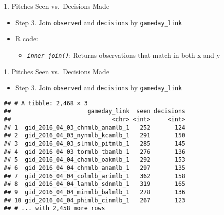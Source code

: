 \begin{frame}[fragile]{1. Pitches Seen vs.~Decisions Made}

\begin{itemize}

\item
  Step 3. Join \texttt{observed} and \texttt{decisions} by
  \texttt{gameday\_link}
\item
  R code:

  \begin{itemize}
  
  \item
    \emph{\texttt{inner\_join()}}: Returns observations that match in
    both x and y
  \end{itemize}
\end{itemize}

\footnotesize

\begin{Shaded}
\begin{Highlighting}[]
\StringTok{ } \NormalTok{)}
\end{Highlighting}
\end{Shaded}

\end{frame}

\begin{frame}[fragile]{1. Pitches Seen vs.~Decisions Made}

\begin{itemize}

\item
  Step 3. Join \texttt{observed} and \texttt{decisions} by
  \texttt{gameday\_link}
\end{itemize}

\footnotesize

\begin{Shaded}
\begin{Highlighting}[]
\StringTok{ } \NormalTok{))}
\end{Highlighting}
\end{Shaded}

\begin{verbatim}
## # A tibble: 2,468 × 3
##                      gameday_link  seen decisions
##                             <chr> <int>     <int>
## 1  gid_2016_04_03_chnmlb_anamlb_1   252       124
## 2  gid_2016_04_03_nynmlb_kcamlb_1   291       150
## 3  gid_2016_04_03_slnmlb_pitmlb_1   285       145
## 4  gid_2016_04_03_tormlb_tbamlb_1   276       136
## 5  gid_2016_04_04_chamlb_oakmlb_1   292       153
## 6  gid_2016_04_04_chnmlb_anamlb_1   297       135
## 7  gid_2016_04_04_colmlb_arimlb_1   362       158
## 8  gid_2016_04_04_lanmlb_sdnmlb_1   319       165
## 9  gid_2016_04_04_minmlb_balmlb_1   278       136
## 10 gid_2016_04_04_phimlb_cinmlb_1   267       123
## # ... with 2,458 more rows
\end{verbatim}

\end{frame}

